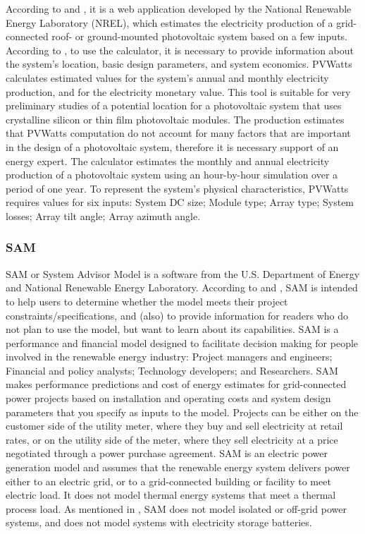 According to \cite{Freeman} and \cite{NRELDobos}, it is a web application developed by the National Renewable Energy Laboratory (NREL), which estimates the electricity production of a grid-connected roof- or ground-mounted photovoltaic system based on a few inputs. According to \cite{NRELDobos}, to use the calculator, it is necessary to provide information about the system's location, basic design parameters, and system economics. PVWatts calculates estimated values for the system's annual and monthly electricity production, and for the electricity monetary value. This tool is suitable for very preliminary studies of a potential location for a photovoltaic system that uses crystalline silicon or thin film photovoltaic modules. The production estimates that PVWatts computation do not account for many factors that are important in the design of a photovoltaic system, therefore it is necessary support of an energy expert. The calculator estimates the monthly and annual electricity production of a photovoltaic system using an hour-by-hour simulation over a period of one year. To represent the system's physical characteristics, PVWatts requires values for six inputs: System DC size; Module type; Array type; System losses; Array tilt angle; Array azimuth angle.

\subsubsection{SAM}

SAM or System Advisor Model is a software from the U.S. Department of Energy and National Renewable Energy Laboratory. According to \cite{NRELBlair} and \cite{Cameron2008}, SAM is intended to help users to determine whether the model meets their project constraints/specifications, and (also) to provide information for readers who do not plan to use the model, but want to learn about its capabilities. SAM is a performance and financial model designed to facilitate decision making for people involved in the renewable energy industry: Project managers and engineers; Financial and policy analysts; Technology developers; and Researchers. SAM makes performance predictions and cost of energy estimates for grid-connected power projects based on installation and operating costs and system design parameters that you specify as inputs to the model. Projects can be either on the customer side of the utility meter, where they buy and sell electricity at retail rates, or on the utility side of the meter, where they sell electricity at a price negotiated through a power purchase agreement. SAM is an electric power generation model and assumes that the renewable energy system delivers power either to an electric grid, or to a grid-connected building or facility to meet electric load. It does not model thermal energy systems that meet a thermal process load. As mentioned in \cite{NRELBlair}, SAM does not model isolated or off-grid power systems, and does not model systems with electricity storage batteries.

